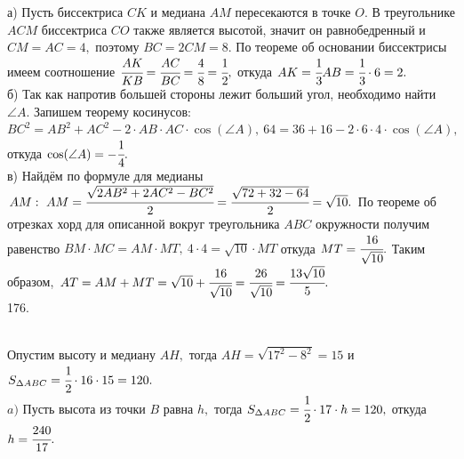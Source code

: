 \documentclass[12pt]{article}
\begin{document}
а) Пусть биссектриса $CK$ и медиана $AM$ пересекаются в точке $O.$ В треугольнике $ACM$ биссектриса $CO$ также является высотой, значит он равнобедренный и $CM=AC=4,$ поэтому $BC=2CM=8.$ По теореме об основании биссектрисы имеем соотношение $\cfrac{AK}{KB}=\cfrac{AC}{BC}=\cfrac{4}{8}=\cfrac{1}{2},$ откуда $AK=\cfrac{1}{3}AB=\cfrac{1}{3}\cdot6=2.$\\
б) Так как напротив большей стороны лежит больший угол, необходимо найти $\angle A.$ Запишем теорему косинусов: $BC^2=AB^2+AC^2-2\cdot AB\cdot AC\cdot \cos(\angle A),\ 64=36+16-2\cdot6\cdot4\cdot \cos(\angle A),$ откуда $\cos(\angle A)=-\cfrac{1}{4}.$\\
в) Найдём по формуле для медианы $AM:\ AM=\cfrac{\sqrt{2AB^2+2AC^2-BC^2}}{2}=\cfrac{\sqrt{72+32-64}}{2}=\sqrt{10}.$ По теореме об отрезках хорд для описанной вокруг треугольника $ABC$ окружности получим равенство $BM\cdot MC= AM\cdot MT,\ 4\cdot4=\sqrt{10}\cdot MT$ откуда $MT=\cfrac{16}{\sqrt{10}}.$ Таким образом,
$AT=AM+MT=\sqrt{10}+\cfrac{16}{\sqrt{10}}=\cfrac{26}{\sqrt{10}}=\cfrac{13\sqrt{10}}{5}.$\\
176. \begin{figure}[ht!]
\end{figure}\\
Опустим высоту и медиану $AH,$ тогда $AH=\sqrt{17^2-8^2}=15$ и $S_{\Delta ABC}=\cfrac{1}{2}\cdot16\cdot15=120.$\\
$a)$ Пусть высота из точки $B$ равна $h,$ тогда $S_{\Delta ABC}=\cfrac{1}{2}\cdot17\cdot h=120,$ откуда $h=\cfrac{240}{17}.$\\
\end{document}
